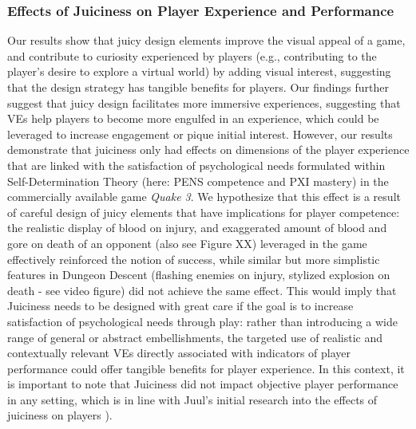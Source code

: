 \documentclass{sigchi}
\begin{document}
\subsubsection{Effects of Juiciness on Player Experience and Performance}
Our results show that juicy design elements improve the visual appeal of a game, and contribute to curiosity experienced by players (e.g., contributing to the player's desire to explore a virtual world) by adding visual interest, suggesting that the design strategy has tangible benefits for players. Our findings further suggest that juicy design facilitates more immersive experiences, suggesting that VEs help players to become more engulfed in an experience, which could be leveraged to increase engagement or pique initial interest. However, our results demonstrate that juiciness only had effects on dimensions of the player experience that are linked with the satisfaction of psychological needs formulated within Self-Determination Theory (here: PENS competence and PXI mastery) in the commercially available game \textit{Quake 3}. We hypothesize that this effect is a result of careful design of juicy elements that have implications for player competence: the realistic display of blood on injury, and exaggerated amount of blood and gore on death of an opponent (also see Figure XX) leveraged in the game effectively reinforced the notion of success, while similar but more simplistic features in Dungeon Descent (flashing enemies on injury, stylized explosion on death - see video figure) did not achieve the same effect. This would imply that Juiciness needs to be designed with great care if the goal is to increase satisfaction of psychological needs through play: rather than introducing a wide range of general or abstract embellishments, the targeted use of realistic and contextually relevant VEs directly associated with indicators of player performance could offer tangible benefits for player experience. In this context, it is important to note that Juiciness did not impact objective player performance in any setting, which is in line with Juul's initial research into the effects of juiciness on players \cite{juul2016good}).
\end{document}
